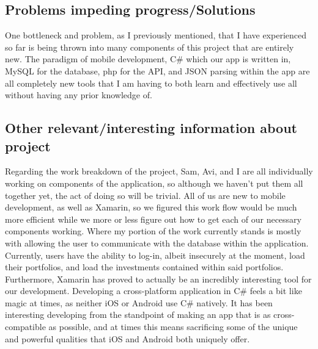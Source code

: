 \documentclass[letterpaper,10pt,titlepage,journal,compsoc,draftclsnofoot,onecolumn]{IEEEtran}
\begin{document}
\subsection{Problems impeding progress/Solutions}

One bottleneck and problem, as I previously mentioned, that I have experienced so far is being thrown into many components of this project that are entirely new. The paradigm of mobile development, C\# which our app is written in, MySQL for the database, php for the API, and JSON parsing within the app are all completely new tools that I am having to both learn and effectively use all without having any prior knowledge of.

\subsection{Other relevant/interesting information about project}
Regarding the work breakdown of the project, Sam, Avi, and I are all individually working on components of the application, so although we haven't put them all together yet, the act of doing so will be trivial. All of us are new to mobile development, as well as Xamarin, so we figured this work flow would be much more efficient while we more or less figure out how to get each of our necessary components working. Where my portion of the work currently stands is mostly with allowing the user to communicate with the database within the application. Currently, users have the ability to log-in, albeit insecurely at the moment, load their portfolios, and load the investments contained within said portfolios. Furthermore, Xamarin has proved to actually be an incredibly interesting tool for our development. Developing a cross-platform application in C\# feels a bit like magic at times, as neither iOS or Android use C\# natively. It has been interesting developing from the standpoint of making an app that is as cross-compatible as possible, and at times this means sacrificing some of the unique and powerful qualities that iOS and Android both uniquely offer. 
\end{document}
